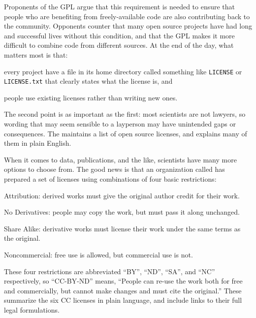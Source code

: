 \documentclass{book}
\begin{document}
Proponents of the GPL argue that this requirement is needed to ensure
that people who are benefiting from freely-available code are also
contributing back to the community. Opponents counter that many open
source projects have had long and successful lives without this
condition, and that the GPL makes it more difficult to combine code from
different sources. At the end of the day, what matters most is that:

\begin{swcenumerate}
\item
  every project have a file in its home directory called something like
  \texttt{LICENSE} or \texttt{LICENSE.txt} that clearly states what the
  license is, and
\item
  people use existing licenses rather than writing new ones.
\end{swcenumerate}

The second point is as important as the first: most scientists are not
lawyers, so wording that may seem sensible to a layperson may have
unintended gaps or consequences. The  maintains a list of open source licenses, and
 explains many of them in
plain English.

When it comes to data, publications, and the like, scientists have many
more options to choose from. The good news is that an organization
called  has prepared
a set of licenses using combinations of four basic restrictions:

\begin{swcitemize}
\item
  Attribution: derived works must give the original author credit for
  their work.
\item
  No Derivatives: people may copy the work, but must pass it along
  unchanged.
\item
  Share Alike: derivative works must license their work under the same
  terms as the original.
\item
  Noncommercial: free use is allowed, but commercial use is not.
\end{swcitemize}

These four restrictions are abbreviated ``BY'', ``ND'', ``SA'', and
``NC'' respectively, so ``CC-BY-ND'' means, ``People can re-use the work
both for free and commercially, but cannot make changes and must cite
the original.'' These  summarize the six CC licenses in plain language, and
include links to their full legal formulations.
\end{document}
